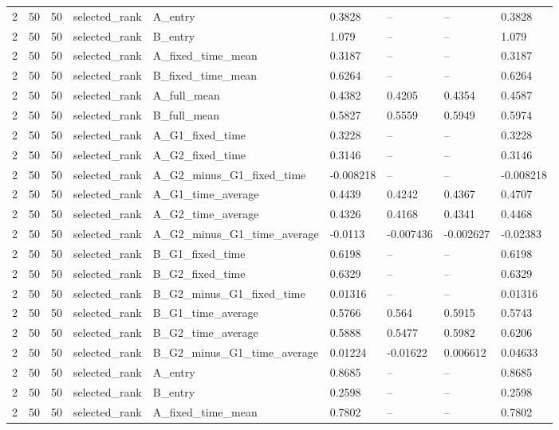 \begin{longtable}{lllllllll}
2 & 50 & 50 & selected\_rank & A\_entry & 0.3828 & -- & -- & 0.3828 \\
2 & 50 & 50 & selected\_rank & B\_entry & 1.079 & -- & -- & 1.079 \\
2 & 50 & 50 & selected\_rank & A\_fixed\_time\_mean & 0.3187 & -- & -- & 0.3187 \\
2 & 50 & 50 & selected\_rank & B\_fixed\_time\_mean & 0.6264 & -- & -- & 0.6264 \\
2 & 50 & 50 & selected\_rank & A\_full\_mean & 0.4382 & 0.4205 & 0.4354 & 0.4587 \\
2 & 50 & 50 & selected\_rank & B\_full\_mean & 0.5827 & 0.5559 & 0.5949 & 0.5974 \\
2 & 50 & 50 & selected\_rank & A\_G1\_fixed\_time & 0.3228 & -- & -- & 0.3228 \\
2 & 50 & 50 & selected\_rank & A\_G2\_fixed\_time & 0.3146 & -- & -- & 0.3146 \\
2 & 50 & 50 & selected\_rank & A\_G2\_minus\_G1\_fixed\_time & -0.008218 & -- & -- & -0.008218 \\
2 & 50 & 50 & selected\_rank & A\_G1\_time\_average & 0.4439 & 0.4242 & 0.4367 & 0.4707 \\
2 & 50 & 50 & selected\_rank & A\_G2\_time\_average & 0.4326 & 0.4168 & 0.4341 & 0.4468 \\
2 & 50 & 50 & selected\_rank & A\_G2\_minus\_G1\_time\_average & -0.0113 & -0.007436 & -0.002627 & -0.02383 \\
2 & 50 & 50 & selected\_rank & B\_G1\_fixed\_time & 0.6198 & -- & -- & 0.6198 \\
2 & 50 & 50 & selected\_rank & B\_G2\_fixed\_time & 0.6329 & -- & -- & 0.6329 \\
2 & 50 & 50 & selected\_rank & B\_G2\_minus\_G1\_fixed\_time & 0.01316 & -- & -- & 0.01316 \\
2 & 50 & 50 & selected\_rank & B\_G1\_time\_average & 0.5766 & 0.564 & 0.5915 & 0.5743 \\
2 & 50 & 50 & selected\_rank & B\_G2\_time\_average & 0.5888 & 0.5477 & 0.5982 & 0.6206 \\
2 & 50 & 50 & selected\_rank & B\_G2\_minus\_G1\_time\_average & 0.01224 & -0.01622 & 0.006612 & 0.04633 \\
2 & 50 & 50 & selected\_rank & A\_entry & 0.8685 & -- & -- & 0.8685 \\
2 & 50 & 50 & selected\_rank & B\_entry & 0.2598 & -- & -- & 0.2598 \\
2 & 50 & 50 & selected\_rank & A\_fixed\_time\_mean & 0.7802 & -- & -- & 0.7802 \\

\end{longtable}
